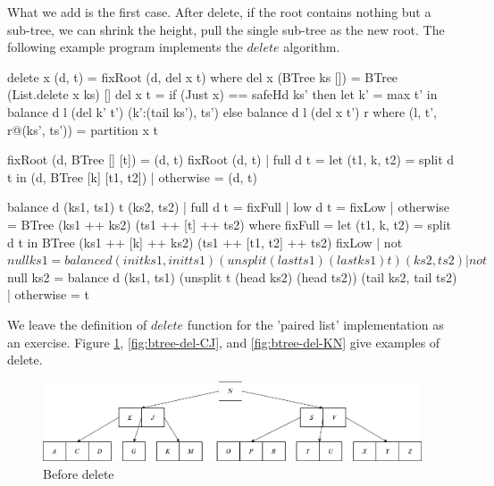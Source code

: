 \documentclass[b5paper]{article}
\begin{document}
What we add is the first case. After delete, if the root contains nothing but a sub-tree, we can shrink the height, pull the single sub-tree as the new root. The following example program implements the $delete$ algorithm.

\begin{Haskell}
delete x (d, t) = fixRoot (d, del x t) where
    del x (BTree ks []) = BTree (List.delete x ks) []
    del x t = if (Just x) == safeHd ks' then
                let k' = max t' in
                   balance d l (del k' t') (k':(tail ks'), ts')
              else balance d l (del x t') r
      where
        (l, t', r@(ks', ts')) = partition x t

fixRoot (d, BTree [] [t]) = (d, t)
fixRoot (d, t) | full d t  = let (t1, k, t2) = split d t in
                               (d, BTree [k] [t1, t2])
               | otherwise = (d, t)

balance d (ks1, ts1) t (ks2, ts2)
    | full d t  = fixFull
    | low  d t  = fixLow
    | otherwise = BTree (ks1 ++ ks2) (ts1 ++ [t] ++ ts2)
  where
    fixFull = let (t1, k, t2) = split d t in
                BTree (ks1 ++ [k] ++ ks2) (ts1 ++ [t1, t2] ++ ts2)
    fixLow | not $ null ks1 = balance d (init ks1, init ts1)
                                      (unsplit (last ts1) (last ks1) t)
                                      (ks2, ts2)
           | not $ null ks2 = balance d (ks1, ts1)
                                      (unsplit t (head ks2) (head ts2))
                                      (tail ks2, tail ts2)
           | otherwise = t
\end{Haskell}

We leave the definition of $delete$ function for the 'paired list' implementation as an exercise. Figure \ref{fig:btree-del-before}, \ref{fig:btree-del-CJ}, and \ref{fig:btree-del-KN} give examples of delete.

\begin{figure}[htbp]
  \centering
  \includegraphics[scale=0.33]{img/btree-del-before.png}
  \caption{Before delete}
  \label{fig:btree-del-before}
\end{figure}
\end{document}
